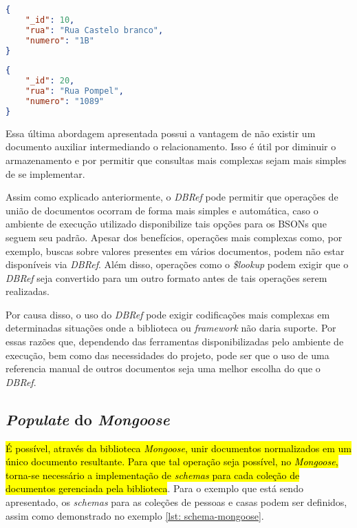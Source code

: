 \begin{lstlisting}[language=json, caption={Documento da Casa de Número 1B\label{lst: doc-dbref-casa-1b-sem-documento-auxiliar}}]
{
    "_id": 10,
    "rua": "Rua Castelo branco",
    "numero": "1B"
}
\end{lstlisting}


\begin{lstlisting}[language=json, caption={Documento da Casa de Número 1089\label{lst: doc-dbref-casa-1089-sem-documento-auxiliar}}]
{
    "_id": 20,
    "rua": "Rua Pompel",
    "numero": "1089"
}
\end{lstlisting}

Essa última abordagem apresentada possui a vantagem de não existir um documento auxiliar intermediando o relacionamento. Isso é útil por diminuir o armazenamento e por permitir que consultas mais complexas sejam mais simples de se implementar.

Assim como explicado anteriormente, o \textit{DBRef} pode permitir que operações de união de documentos ocorram de forma mais simples e automática, caso o ambiente de execução utilizado disponibilize tais opções para os BSONs que seguem seu padrão. Apesar dos benefícios, operações mais complexas como, por exemplo, buscas sobre valores presentes em vários documentos, podem não estar disponíveis via \textit{DBRef}. Além disso, operações como o \textit{\$lookup} podem exigir que o \textit{DBRef} seja convertido para um outro formato antes de tais operações serem realizadas. 

Por causa disso, o uso do \textit{DBRef} pode exigir codificações mais complexas em determinadas situações onde a biblioteca ou \textit{framework} não daria suporte. Por essas razões que, dependendo das ferramentas disponibilizadas pelo ambiente de execução, bem como das necessidades do projeto, pode ser que o uso de uma referencia manual de outros documentos seja uma melhor escolha do que o \textit{DBRef}.

\subsection{\textit{Populate} do \textit{Mongoose}}

\hl{É possível, através da biblioteca \textit{Mongoose}, unir documentos normalizados em um único documento resultante. Para que tal operação seja possível, no \textit{Mongoose}, torna-se necessário a implementação de \textit{schemas} para cada coleção de documentos gerenciada pela biblioteca}. Para o exemplo que está sendo apresentado, os \textit{schemas} para as coleções de pessoas e casas podem ser definidos, assim como demonstrado no exemplo \ref{lst: schema-mongoose}.

